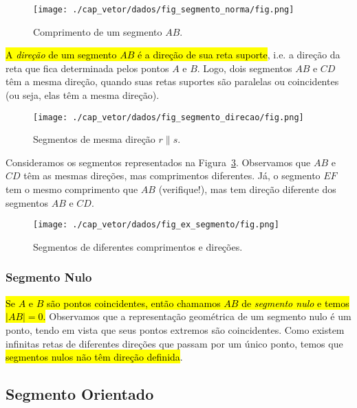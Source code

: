 \begin{figure}[h]
  \centering
  \texttt{[image: ./cap\_vetor/dados/fig\_segmento\_norma/fig.png]}
  \caption{Comprimento de um segmento $AB$.}
  \label{cap_vetor_sec_segorien:fig:segmento_norma}
\end{figure}

\hl{A \emph{direção} de um segmento $AB$ é a direção de sua reta suporte}, i.e. a direção da reta que fica determinada pelos pontos $A$ e $B$. Logo, dois segmentos $AB$ e $CD$ têm a mesma direção, quando suas retas suportes são paralelas ou coincidentes (ou seja, elas têm a mesma direção).

\begin{figure}[h]
  \centering
  \texttt{[image: ./cap\_vetor/dados/fig\_segmento\_direcao/fig.png]}
  \caption{Segmentos de mesma direção $r\parallel s$.}
  \label{cap_vetor_sec_segorien:fig:segmento_direção.}
\end{figure}

\begin{ex}\label{cap_vetor_sec_segorien:ex:segmento}
  Consideramos os segmentos representados na Figura~\ref{cap_vetor_sec_segorien:fig:ex_segmento}. Observamos que $AB$ e $CD$ têm as mesmas direções, mas comprimentos diferentes. Já, o segmento $EF$ tem o mesmo comprimento que $AB$ (verifique!), mas tem direção diferente dos segmentos $AB$ e $CD$.
  
  \begin{figure}[h]
    \centering
    \texttt{[image: ./cap\_vetor/dados/fig\_ex\_segmento/fig.png]}
  \caption{Segmentos de diferentes comprimentos e direções.}
  \label{cap_vetor_sec_segorien:fig:ex_segmento}
\end{figure}
\end{ex}

\subsubsection{Segmento Nulo}

\hl{Se $A$ e $B$ são pontos coincidentes, então chamamos $AB$ de \emph{segmento nulo} e temos $|AB| = 0$.} Observamos que a representação geométrica de um segmento nulo é um ponto, tendo em vista que seus pontos extremos são coincidentes. Como existem infinitas retas de diferentes direções que passam por um único ponto, temos que \hl{segmentos nulos não têm direção definida}.

\subsection{Segmento Orientado}

